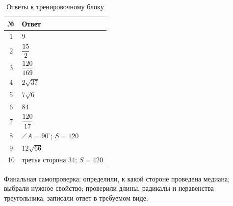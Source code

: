 \documentclass[a4paper,12pt]{article}
\begin{document}
\renewcommand{\arraystretch}{1.4}
\begin{table}[h!]
\centering
\caption{Ответы к тренировочному блоку}
\begin{tabularx}{0.78\linewidth}{@{}cX@{}}
\toprule
\textbf{№} & \textbf{Ответ} \\
\midrule
1 & $9$ \\
2 & $\dfrac{15}{2}$ \\
3 & $\dfrac{120}{169}$ \\
4 & $2\sqrt{37}$ \\
5 & $7\sqrt{6}$ \\
6 & $84$ \\
7 & $\dfrac{120}{17}$ \\
8 & $\angle A=90^\circ$; $S=120$ \\
9 & $12\sqrt{66}$ \\
10 & третья сторона $34$; $S=420$ \\
\bottomrule
\end{tabularx}
\end{table}

\vfill
{\small\color{textgray}
Финальная самопроверка: определили, к какой стороне проведена медиана; выбрали нужное свойство; проверили длины, радикалы и неравенства треугольника; записали ответ в требуемом виде.
}
\end{document}
